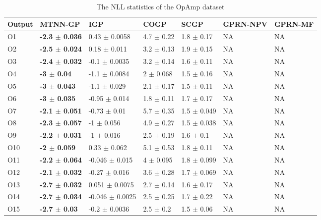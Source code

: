 \begin{table}[!htb]
    \centering
    \caption{The NLL statistics of the OpAmp dataset}
    \label{tab:nll_DAC}
    \begin{tabular}{lllllll}
        \toprule
        Output & MTNN-GP                       & IGP                     & COGP                & SCGP                & GPRN-NPV & GPRN-MF \\ \midrule
        O1     &  \textbf{-2.3  $\pm$  0.036}  &  0.43    $\pm$  0.0058  &  4.7  $\pm$  0.22   &  1.8  $\pm$  0.17   &  NA      & NA \\
        O2     &  \textbf{-2.5  $\pm$  0.024}  &  0.18    $\pm$  0.011   &  3.2  $\pm$  0.13   &  1.9  $\pm$  0.15   &  NA      & NA \\
        O3     &  \textbf{-2.4  $\pm$  0.032}  &  -0.1    $\pm$  0.0035  &  3.2  $\pm$  0.14   &  1.6  $\pm$  0.11   &  NA      & NA \\
        O4     &  \textbf{-3    $\pm$  0.04 }  &  -1.1    $\pm$  0.0084  &  2    $\pm$  0.068  &  1.5  $\pm$  0.16   &  NA      & NA \\
        O5     &  \textbf{-3    $\pm$  0.043}  &  -1.1    $\pm$  0.029   &  2.1  $\pm$  0.17   &  1.5  $\pm$  0.11   &  NA      & NA \\
        O6     &  \textbf{-3    $\pm$  0.035}  &  -0.95   $\pm$  0.014   &  1.8  $\pm$  0.11   &  1.7  $\pm$  0.17   &  NA      & NA \\
        O7     &  \textbf{-2.1  $\pm$  0.051}  &  -0.73   $\pm$  0.01    &  5.7  $\pm$  0.35   &  1.5  $\pm$  0.049  &  NA      & NA \\
        O8     &  \textbf{-2.3  $\pm$  0.057}  &  -1      $\pm$  0.056   &  4.9  $\pm$  0.27   &  1.5  $\pm$  0.038  &  NA      & NA \\
        O9     &  \textbf{-2.2  $\pm$  0.031}  &  -1      $\pm$  0.016   &  2.5  $\pm$  0.19   &  1.6  $\pm$  0.1    &  NA      & NA \\
        O10    &  \textbf{-2    $\pm$  0.059}  &  0.33    $\pm$  0.062   &  5.1  $\pm$  0.53   &  1.8  $\pm$  0.11   &  NA      & NA \\
        O11    &  \textbf{-2.2  $\pm$  0.064}  &  -0.046  $\pm$  0.015   &  4    $\pm$  0.095  &  1.8  $\pm$  0.099  &  NA      & NA \\
        O12    &  \textbf{-2.1  $\pm$  0.032}  &  -0.27   $\pm$  0.016   &  3.6  $\pm$  0.28   &  1.7  $\pm$  0.069  &  NA      & NA \\
        O13    &  \textbf{-2.7  $\pm$  0.032}  &  0.051   $\pm$  0.0075  &  2.7  $\pm$  0.14   &  1.6  $\pm$  0.17   &  NA      & NA \\
        O14    &  \textbf{-2.7  $\pm$  0.034}  &  -0.046  $\pm$  0.0025  &  2.5  $\pm$  0.25   &  1.7  $\pm$  0.22   &  NA      & NA \\
        O15    &  \textbf{-2.7  $\pm$  0.03 }  &  -0.2    $\pm$  0.0036  &  2.5  $\pm$  0.2    &  1.5  $\pm$  0.06   &  NA      & NA \\
        \bottomrule
    \end{tabular}
\end{table}

